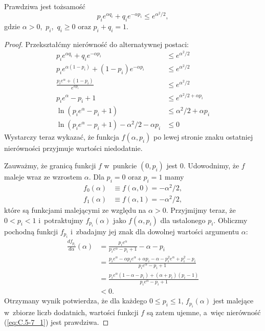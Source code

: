 \exercise{} %

\begin{lemat}
	Prawdziwa jest tożsamość
	\[
		p_ie^{\alpha q_i}+q_ie^{-\alpha p_i} \le e^{\alpha^2\!/2}, \tag{$*$}\label{eq:C.5-7_1}
	\]
	gdzie $\alpha>0$,~$p_i$,~$q_i\ge0$ oraz $p_i+q_i=1$.
\end{lemat}
\begin{proof}
	Przekształćmy nierówność do alternatywnej postaci:
	\begin{align*}
		p_ie^{\alpha q_i}+q_ie^{-\alpha p_i} &\le e^{\alpha^2\!/2} \\[1mm]
		p_ie^{\alpha(1-p_i)}+(1-p_i)e^{-\alpha p_i} &\le e^{\alpha^2\!/2} \\[2mm]
		\frac{p_ie^\alpha+(1-p_i)}{e^{\alpha p_i}} &\le e^{\alpha^2\!/2} \\[1mm]
		p_ie^\alpha-p_i+1 &\le e^{\alpha^2\!/2+\alpha p_i} \\[1mm]
		\ln(p_ie^\alpha-p_i+1) &\le \alpha^2\!/2+\alpha p_i \\[1mm]
		\ln(p_ie^\alpha-p_i+1)-\alpha^2\!/2-\alpha p_i &\le 0
	\end{align*}
	Wystarczy teraz wykazać, że funkcja $f(\alpha,p_i)$ po lewej stronie znaku ostatniej nierówności przyjmuje wartości niedodatnie.

	Zauważmy, że granicą funkcji $f$ w~punkcie $(0,p_i)$ jest 0. Udowodnimy, że $f$ maleje wraz ze wzrostem $\alpha$. Dla $p_i=0$ oraz $p_i=1$ mamy
	\begin{align*}
	    f_0(\alpha) &\equiv f(\alpha,0) = -\alpha^2\!/2, \\
		f_1(\alpha) &\equiv f(\alpha,1) = -\alpha^2\!/2,
	\end{align*}
	które są funkcjami malejącymi ze względu na $\alpha>0$. Przyjmijmy teraz, że $0<p_i<1$ i~potraktujmy $f_{p_i}(\alpha)$ jako $f(\alpha,p_i)$ dla ustalonego $p_i$. Obliczmy pochodną funkcji $f_{p_i}$ i~zbadajmy jej znak dla dowolnej wartości argumentu $\alpha$:
	\begin{align*}
	    \frac{df_{p_i}}{d\alpha}(\alpha) &= \frac{p_ie^\alpha}{p_ie^\alpha-p_i+1}-\alpha-p_i \\[1mm]
		&= \frac{p_ie^\alpha-\alpha p_ie^\alpha+\alpha p_i-\alpha-p_i^2e^\alpha+p_i^2-p_i}{p_ie^\alpha-p_i+1} \\[1mm]
		&= \frac{p_ie^\alpha(1-\alpha-p_i)+(\alpha+p_i)(p_i-1)}{p_ie^\alpha-p_i+1} \\
		&< 0.
	\end{align*}
	Otrzymany wynik potwierdza, że dla każdego $0\le p_i\le1$, $f_{p_i}(\alpha)$ jest malejące w~zbiorze liczb dodatnich, wartości funkcji $f$ są zatem ujemne, a~więc nierówność (\ref{eq:C.5-7_1}) jest prawdziwa.
\end{proof}

